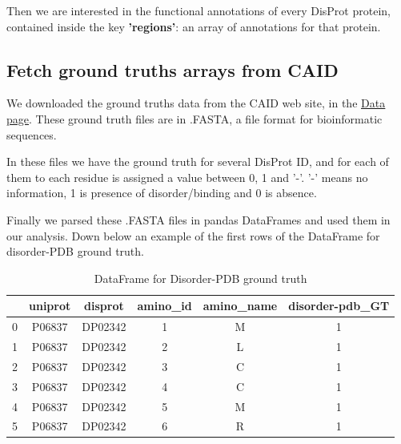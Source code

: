 Then we are interested in the functional annotations of every DisProt protein, contained inside the key \textbf{'regions'}:  an array of annotations for that protein.

\pagebreak

\subsection{Fetch ground truths arrays from CAID}
We downloaded the ground truths data from the CAID web site, in the \href{https://caid.idpcentral.org/challenge#Data}{\underline{Data page}}. These ground truth files are in .FASTA, a file format for bioinformatic sequences. 

In these files we have the ground truth for several DisProt ID, and for each of them to each residue is assigned a value between 0, 1 and '-'. '-' means no information, 1 is presence of disorder/binding and 0 is absence.

Finally we parsed these .FASTA files in pandas DataFrames and used them in our analysis. Down below an example of the first rows of the DataFrame for disorder-PDB ground truth.

\begin{table}[h!]
    \centering
    \begin{tabular}{c|c|c|c|c|c}
         & uniprot & disprot & \small amino\_id & amino\_name & disorder-pdb\_GT \normalsize \\
         \hline
        0 & P06837 & DP02342 & 1 & M & 1 \\
        1 & P06837 & DP02342 & 2 & L & 1 \\
        2 & P06837 & DP02342 & 3 & C & 1 \\
        3 & P06837 & DP02342 & 4 & C & 1 \\
        4 & P06837 & DP02342 & 5 & M & 1 \\
        5 & P06837 & DP02342 & 6 & R & 1 \\
    \end{tabular}
    \caption{DataFrame for Disorder-PDB ground truth}
\end{table}